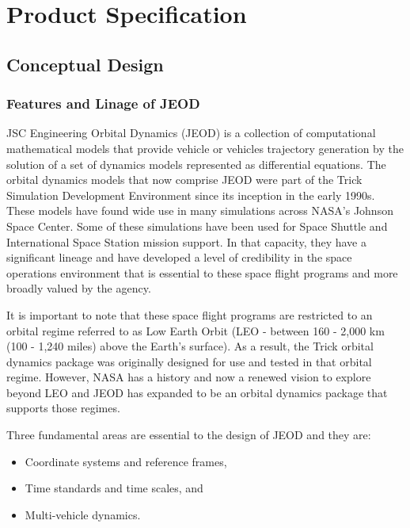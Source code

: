 %
%
%
%
% 

\chapter{Product Specification} \label{ch:spec}
\section{Conceptual Design}
\subsection{Features and Linage of JEOD}
 JSC Engineering Orbital Dynamics (JEOD) is a collection of computational mathematical models that provide vehicle or vehicles trajectory generation by the solution of a set of dynamics models represented as differential equations.  The orbital dynamics models that now comprise JEOD were part of the Trick Simulation Development Environment since its inception in the early 1990s.  These models have found wide use in many simulations across NASA's Johnson Space Center.  Some of these simulations have been used for Space Shuttle and International Space Station mission support.  In that capacity, they have a significant lineage and have developed a level of credibility in the space operations environment that is essential to these space flight programs and more broadly valued by the agency.

It is important to note that these space flight programs are restricted to an orbital regime referred to as Low Earth Orbit (LEO - between 160 - 2,000 km (100 - 1,240 miles) above the Earth's surface).  As a result, the Trick orbital dynamics package was originally designed for use and tested in that orbital regime.  However, NASA has a history and now a renewed vision to explore beyond LEO and JEOD has expanded to be an orbital dynamics package that supports those regimes.

Three fundamental areas are essential to the design of JEOD and they are:
\begin{itemize}

\item Coordinate systems and reference frames,

\item Time standards and time scales, and

\item Multi-vehicle dynamics.

\end{itemize}

